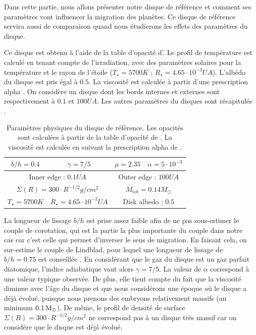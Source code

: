 Dans cette partie, nous allons présenter notre disque de référence et comment ses paramètres vont influencer la migration des
planètes. Ce disque de référence servira aussi de comparaison quand nous étudierons les effets des paramètres du disque.

Ce disque est obtenu à l'aide de la table d'opacité d'\cite{hure2000transition}. Le profil de température est
calculé en tenant compte de l'irradiation, avec des paramètres solaires pour la température et le rayon de l'étoile ($T_\star =
5700\unit{K}$ ; $R_\star = 4.65\cdot 10^{-3}\unit{UA}$). L'albédo du disque est pris égal à $0.5$. La viscosité est calculée à
partir d'une prescription alpha \citep{shakura1973black}. On considère un disque dont les bords internes et externes sont
respectivement à $0.1$ et $100\unit{UA}$. Les autres paramètres du disques sont récapitulés . 

\begin{table}[htbp]
\centering
\begin{tabular}{|c|c|c|c|}
\hline
$b/h = 0.4$ & $\gamma = 7/5$ & $\mu = 2.35$ & $\alpha = 5\cdot 10^{-3}$ \\\hline
\multicolumn{2}{|c|}{Inner edge : $0.1\unit{UA}$} & \multicolumn{2}{c|}{Outer edge : $100\unit{UA}$}\\\hline
\multicolumn{2}{|c|}{$\Sigma(R) = 300 \cdot R^{-1/2}\unit{g/cm^2}$}& \multicolumn{2}{c|}{$M_\text{tot} = 0.14\unit{M_\odot}$}\\\hline
$T_\star = 5700\unit{K}$ & $R_\star = 4.65\cdot 10^{-3}\unit{UA}$ & \multicolumn{2}{c|}{Disk albedo : $0.5$}\\\hline
\end{tabular}
\caption[Paramètres physiques du disque de référence.]{Paramètres physiques du disque de référence. Les opacités sont calculées
à partir de la table d'opacité de
\cite{hure2000transition}. La viscosité est calculée en suivant la prescription alpha de
\cite{shakura1973black}.}\label{tab:fiducial_parameters}
\end{table}

La longueur de lissage $b/h$ est prise assez faible afin de ne pas sous-estimer le couple de corotation, qui est la partie la plus importante du couple dans notre cas car c'est celle qui permet d'inverser le sens de migration. En faisant cela, on sur-estime le couple de Lindblad, pour lequel une longueur de lissage de $b/h=0.75$ est conseillée \citep{masset2002coorbital}.
En considérant que le gaz du disque est un gaz parfait diatomique, l'indice adiabatique vaut alors $\gamma=7/5$.
La valeur de $\alpha$ correspond à une valeur typique observée. De plus, elle tient compte du fait que la viscosité diminue avec l'âge du disque et que nous considérons une époque où le disque a déjà évolué, puisque nous prenons des embryons relativement massifs (au minimum $0.1\mathrm{\thinspace M_\oplus}$). De même, le profil de densité de surface $\Sigma(R) = 300 \cdot R^{-1/2}\unit{g/cm^2}$ ne correspond pas à un disque très massif car on considère que le disque est déjà évolué. 

